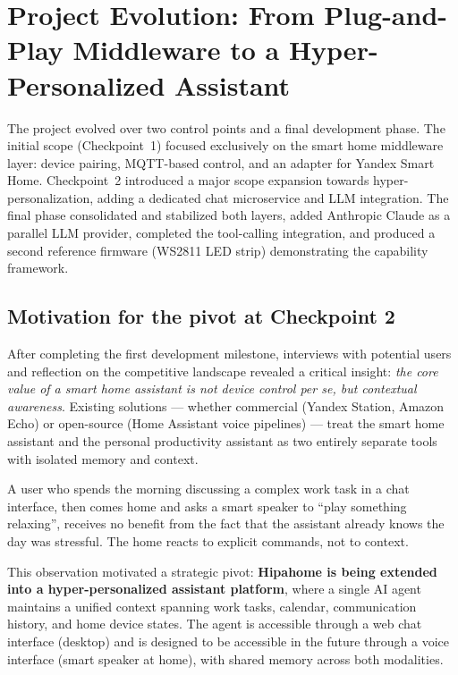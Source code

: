\documentclass[a4paper,12pt]{article}
\begin{document}
\newpage

\section{Project Evolution: From Plug-and-Play Middleware to a Hyper-Personalized Assistant}
\label{sec:evolution}

The project evolved over two control points and a final development phase. The initial scope (Checkpoint~1) focused exclusively on the smart home middleware layer: device pairing, MQTT-based control, and an adapter for Yandex Smart Home. Checkpoint~2 introduced a major scope expansion towards hyper-personalization, adding a dedicated chat microservice and LLM integration. The final phase consolidated and stabilized both layers, added Anthropic Claude as a parallel LLM provider, completed the tool-calling integration, and produced a second reference firmware (WS2811 LED strip) demonstrating the capability framework.

\subsection{Motivation for the pivot at Checkpoint 2}

After completing the first development milestone, interviews with potential users and reflection on the competitive landscape revealed a critical insight: \emph{the core value of a smart home assistant is not device control per se, but contextual awareness}. Existing solutions --- whether commercial (Yandex Station, Amazon Echo) or open-source (Home Assistant voice pipelines) --- treat the smart home assistant and the personal productivity assistant as two entirely separate tools with isolated memory and context.

A user who spends the morning discussing a complex work task in a chat interface, then comes home and asks a smart speaker to ``play something relaxing'', receives no benefit from the fact that the assistant already knows the day was stressful. The home reacts to explicit commands, not to context.

This observation motivated a strategic pivot: \textbf{Hipahome is being extended into a hyper-personalized assistant platform}, where a single AI agent maintains a unified context spanning work tasks, calendar, communication history, and home device states. The agent is accessible through a web chat interface (desktop) and is designed to be accessible in the future through a voice interface (smart speaker at home), with shared memory across both modalities.
\end{document}
